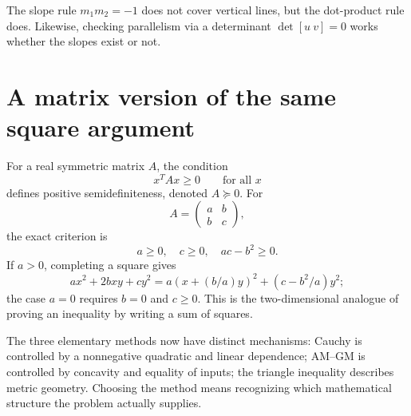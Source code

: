 The slope rule \(m_1m_2=-1\) does not cover vertical lines, but the dot-product rule does. Likewise, checking parallelism via a determinant \(\det[u\ v]=0\) works whether the slopes exist or not.

\section{A matrix version of the same square argument}

For a real symmetric matrix \(A\), the condition
\[
 x^TAx\ge0\qquad\text{for all }x
\]
defines positive semidefiniteness, denoted \(A\succeq0\). For
\[
 A=\begin{pmatrix}a&b\\b&c\end{pmatrix},
\]
the exact criterion is
\[
 a\ge0,\quad c\ge0,\quad ac-b^2\ge0.
\]
If \(a>0\), completing a square gives
\[
 ax^2+2bxy+cy^2
 =a(x+(b/a)y)^2+(c-b^2/a)y^2;
\]
the case \(a=0\) requires \(b=0\) and \(c\ge0\). This is the two-dimensional analogue of proving an inequality by writing a sum of squares.

The three elementary methods now have distinct mechanisms: Cauchy is controlled by a nonnegative quadratic and linear dependence; AM--GM is controlled by concavity and equality of inputs; the triangle inequality describes metric geometry. Choosing the method means recognizing which mathematical structure the problem actually supplies.
